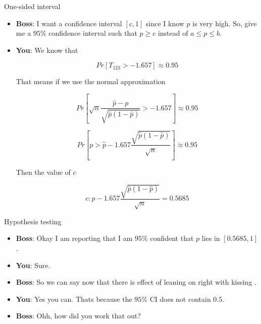 \documentclass{beamer}\usepackage[]{graphicx}\usepackage[]{color}
\begin{document}
\begin{frame}{One-sided interval}

\begin{itemize}
\item \textbf{Boss}: I want a confidence interval $[c, 1]$ since I know $p$ is very high. So, give me a $95 \%$ confidence interval such that $p \geq c$ instead of $a \leq p \leq b$. \pause

\item \textbf{You}:  We know that

$$ Pr \left [ T_{123} > -1.657 \right ] \approx 0.95 $$ \pause

That means if we use the normal approximation

$$ Pr \left [  \sqrt{n} \frac{\hat{p} - p}{\sqrt{\hat{p}(1-\hat{p})}} > -1.657 \right ] \approx 0.95 $$ \pause

$$ Pr \left [ p >  \hat{p} - 1.657 \frac{\sqrt{\hat{p}(1-\hat{p})}}{\sqrt{n}} \right] \approx 0.95 $$ \pause

Then the value of $c$

$$ c: \hat{p} - 1.657 \frac{\sqrt{\hat{p}(1-\hat{p})}}{\sqrt{n}} = 0.5685 $$ \pause
\end{itemize}

\end{frame}

\begin{frame}{Hypothesis testing}

\begin{itemize}
\item \textbf{Boss}: Okay I am reporting that I am $95\%$ confident that $p$ lies in $ \left [0.5685, 1 \right]$.

\item \textbf{You}: Sure.

\item \textbf{Boss}: So we can say now that there is effect of leaning on right with kissing .

\item \textbf{You}: Yes you can. Thats because the $95\%$ CI does not contain $0.5$.

\item \textbf{Boss}: Ohh, how did you work that out?

\end{itemize}

\end{frame}
\end{document}
